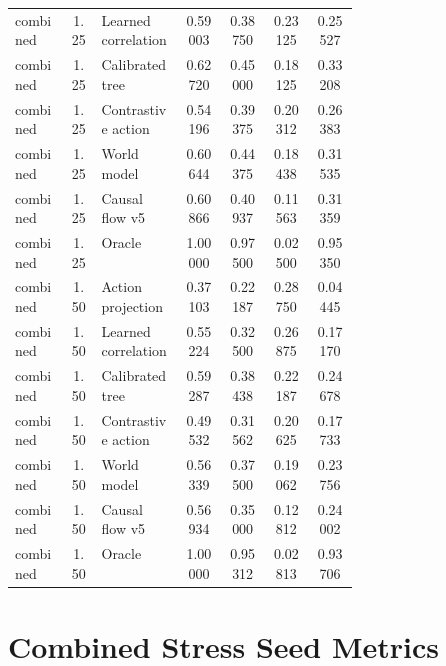 \documentclass{article}
\begin{document}
\begin{center}
\begin{longtable}{p{0.16\linewidth}cp{0.24\linewidth}cccc}
combined & 1.25 & Learned correlation & 0.59003 & 0.38750 & 0.23125 & 0.25527\\
combined & 1.25 & Calibrated tree & 0.62720 & 0.45000 & 0.18125 & 0.33208\\
combined & 1.25 & Contrastive action & 0.54196 & 0.39375 & 0.20312 & 0.26383\\
combined & 1.25 & World model & 0.60644 & 0.44375 & 0.18438 & 0.31535\\
combined & 1.25 & Causal flow v5 & 0.60866 & 0.40937 & 0.11563 & 0.31359\\
combined & 1.25 & Oracle & 1.00000 & 0.97500 & 0.02500 & 0.95350\\
combined & 1.50 & Action projection & 0.37103 & 0.22187 & 0.28750 & 0.04445\\
combined & 1.50 & Learned correlation & 0.55224 & 0.32500 & 0.26875 & 0.17170\\
combined & 1.50 & Calibrated tree & 0.59287 & 0.38438 & 0.22187 & 0.24678\\
combined & 1.50 & Contrastive action & 0.49532 & 0.31562 & 0.20625 & 0.17733\\
combined & 1.50 & World model & 0.56339 & 0.37500 & 0.19062 & 0.23756\\
combined & 1.50 & Causal flow v5 & 0.56934 & 0.35000 & 0.12812 & 0.24002\\
combined & 1.50 & Oracle & 1.00000 & 0.95312 & 0.02813 & 0.93706\\
\bottomrule
\end{longtable}
\normalsize
\end{center}

\section{Combined Stress Seed Metrics}
\end{document}
